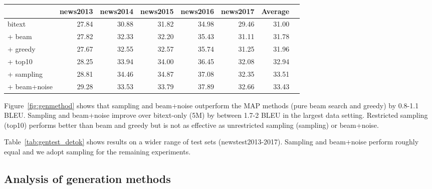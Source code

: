\documentclass[11pt,a4paper]{article}
\begin{document}
\begin{table*}[t]
\centering
\begin{tabular}{lrrrrrrr}
\toprule
& \bf \bf news2013 & \bf news2014 & \bf news2015 & \bf news2016 & \bf news2017 & \bf Average \\ \midrule
bitext & 27.84 & 30.88 & 31.82 & 34.98 & 29.46 & 31.00 \\ \midrule
+ beam & 27.82 & 32.33 & 32.20 & 35.43 & 31.11 & 31.78 \\ + greedy & 27.67 & 32.55 & 32.57 & 35.74 & 31.25 & 31.96 \\ + top10 & 28.25 & 33.94 & 34.00 & 36.45 & 32.08 & 32.94 \\ + sampling & 28.81 & 34.46 & 34.87 & 37.08 & 32.35 & 33.51 \\ + beam+noise & 29.28 & 33.53 & 33.79 & 37.89 & 32.66 & 33.43 \\ \bottomrule
\end{tabular}
\caption{Tokenized BLEU on various test sets of WMT English-German when adding 24M synthetic sentence pairs obtained by various generation methods to a 5.2M sentence-pair bitext (cf. Figure~\ref{fig:genmethod}).
}
\label{tab:gentest_detok}
\end{table*}


Figure~\ref{fig:genmethod} shows that sampling and beam+noise outperform the MAP methods (pure beam search and greedy) by 0.8-1.1 BLEU.
Sampling and beam+noise improve over bitext-only (5M) by between 1.7-2 BLEU in the largest data setting.
Restricted sampling (top10) performs better than beam and greedy but is not as effective as unrestricted sampling (sampling) or beam+noise.

Table~\ref{tab:gentest_detok} shows results on a wider range of test sets (newstest2013-2017). 
Sampling and beam+noise perform roughly equal and we adopt sampling for the remaining experiments.



\subsection{Analysis of generation methods}
\label{sec:analysis}
\end{document}
